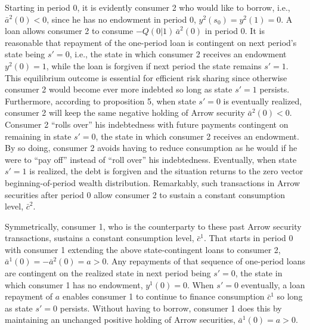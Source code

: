 Starting in period 0, it is evidently consumer 2
who would like to borrow, i.e.,  $\bar a^2(0)<0$, since he 
has no endowment in period 0, $y^2(s_0)=y^2(1)=0$.
A loan allows consumer 2 to consume
$-Q(0 | 1)\, \bar a^2(0)$ in period 0. It is reasonable 
that  repayment of the one-period loan is
contingent on next period's state being
$s'=0$, i.e., the state in which consumer 2 
receives an endowment $y^2(0)=1$, while the
loan is forgiven if next period the  state remains  $s'=1$. This equilibrium outcome is 
essential for  efficient risk sharing since
otherwise consumer 2 would become ever more
indebted so long as state $s'=1$ persists.
Furthermore, according to proposition 5, 
when state $s'=0$ is eventually realized, 
consumer 2 will keep the same negative 
holding of Arrow security $\bar a^2(0)<0$.
Consumer 2  ``rolls over''
his indebtedness with future payments
contingent on remaining in state $s'=0$, the state
in which consumer 2 receives an endowment. By 
so doing, consumer 2 avoids having to reduce
consumption as he would  if he were  to ``pay off'' instead of  ``roll over'' 
his indebtedness. Eventually, when state $s'=1$ 
is realized, the debt is forgiven and the 
situation returns  to the zero vector beginning-of-period 
wealth distribution. Remarkably, such 
transactions in Arrow securities after period 0 
allow consumer 2 to sustain a constant 
consumption level, $\bar c^2$.

Symmetrically,  consumer 1, who is the counterparty to these past Arrow
security transactions,  sustains  a constant consumption level,
$\bar c^1$. That starts in period 0 with
consumer 1 extending the above state-contingent 
loans to consumer 2, $\bar a^1(0)=- \bar a^2(0)=a >0$.
Any repayments of  that sequence of 
one-period loans are contingent on the
realized state in next period being $s'=0$, the
state in which consumer 1 has no endowment,
$y^1(0)=0$. When $s' = 0$ eventually, 
a loan repayment of $a$ enables consumer 1 
to continue to finance consumption 
$\bar c^1$ so long as state $s'=0$ persists. 
Without having to borrow, consumer 1 does this 
by maintaining an unchanged positive holding of 
Arrow securities, $\bar a^1(0)=a>0$. 

